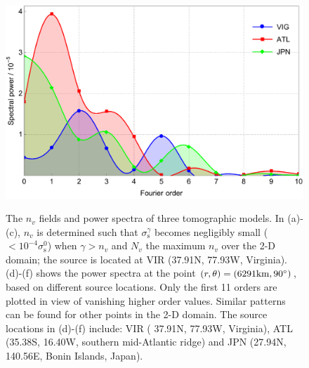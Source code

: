 \documentclass[extra,referee]{gji}
\begin{document}
\begin{figure}
\begin{minipage}{0.6\textwidth}
    \label{fig:s2pow}\par \medskip \vfill
    \includegraphics[height=.6\textwidth]{fig/model/s4pow.pdf} 
    \label{fig:s4pow}\par \medskip \vfill
  \end{minipage}%
  \caption{The $n_v$ fields and power spectra of three tomographic models.
  In (a)-(c), $n_v$ is determined such that $\sigma_{\text{s}}^\gamma$ 
  becomes negligibly small ($<10^{-4}\sigma_{\text{s}}^0$) when 
  $\gamma>n_v$ and $N_v$ the maximum $n_v$
  over the 2-D domain; 
  the source is located at VIR (37.91\degr N, 77.93\degr W, Virginia).
  (d)-(f) shows the power spectra at the point
  $\left(r,\theta\right)=\left(6291\text{km},90\hbox{$^\circ$}\right)$, based on different source
  locations. Only the first 11 orders are plotted in view of vanishing 
  higher order values. Similar patterns can be found for other points 
  in the 2-D domain. 
  The source locations in (d)-(f) include: VIR (
  37.91\degr N, 77.93\degr W, Virginia), ATL (35.38\degr S, 
  16.40\degr W, southern mid-Atlantic ridge) and JPN (27.94\degr N, 
  140.56\degr E, Bonin Islands, Japan).}
  \label{fig:spectra}
\end{figure}
\end{document}
